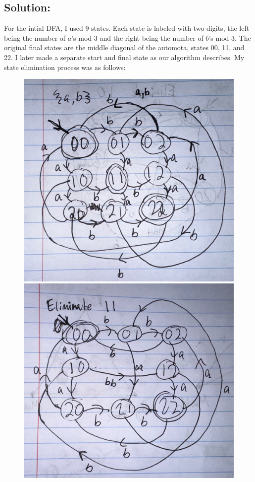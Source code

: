 \documentclass[12pt]{article}
\begin{document}
\subsection*{\textbf{Solution:}}
For the intial DFA, I used 9 states. Each state is labeled with two digits, the left being the number of $a$'s mod 3 and the right being the number of $b$'s mod 3. The original final states are the middle diagonal of the automota, states 00, 11, and 22. I later made a separate start and final state as our algorithm describes. My state elimination process was as follows:

\begin{figure} [!h]
	\centering
	\includegraphics[scale=.2]{14.10.3.1}
	\includegraphics[scale=.2]{14.10.3.2}
\end{figure}
\end{document}
